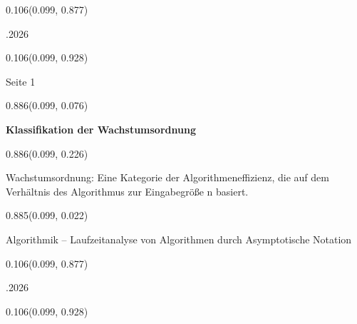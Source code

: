 \documentclass[aspectratio=169]{beamer}
\begin{document}
\begin{frame}[fragile]
\begin{textblock}{0.106}(0.099, 0.877)
  \begin{minipage}[b][0.026\paperheight]{\linewidth}
    \raggedright
    \fontsize{3}{3.3}.2026
  \end{minipage}
\end{textblock}

\begin{textblock}{0.106}(0.099, 0.928)
  \begin{minipage}[b][0.031\paperheight]{\linewidth}
    \raggedright
    \fontsize{3}{3.3}\selectfont Seite 1
  \end{minipage}
\end{textblock}
\end{frame}

\begin{frame}[fragile]
  \begin{textblock}{0.886}(0.099, 0.076)
    \begin{minipage}[t][0.131\paperheight]{\linewidth}
      \textbf{Klassifikation der Wachstumsordnung}
    \end{minipage}
  \end{textblock}
  \begin{textblock}{0.886}(0.099, 0.226)
    \begin{minipage}[t][0.63\paperheight]{\linewidth}
      Wachstumsordnung: Eine Kategorie der Algorithmeneffizienz, die auf dem Verhältnis des Algorithmus zur Eingabegröße n basiert.
    \end{minipage}
  \end{textblock}
  \begin{textblock}{0.885}(0.099, 0.022)
    \begin{minipage}[b][0.031\paperheight]{\linewidth}
      \raggedright
      \fontsize{3}{3.3}\selectfont Algorithmik – Laufzeitanalyse von Algorithmen durch Asymptotische Notation
    \end{minipage}
  \end{textblock}
  \begin{textblock}{0.106}(0.099, 0.877)
    \begin{minipage}[b][0.026\paperheight]{\linewidth}
      \raggedright
      \fontsize{3}{3.3}.2026
    \end{minipage}
  \end{textblock}
  \begin{textblock}{0.106}(0.099, 0.928)
    \begin{minipage}[b][0.031\paperheight]{\linewidth}

\end{minipage}
\end{textblock}
\end{frame}
\end{document}
